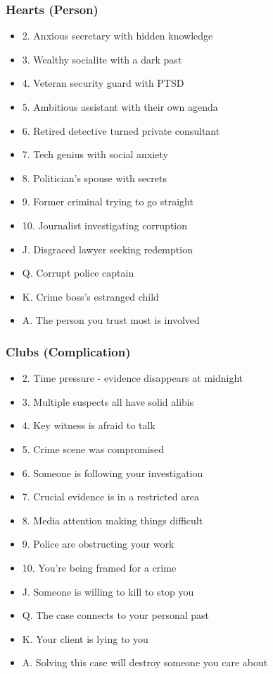 \documentclass[11pt]{article}
\begin{document}
\subsubsection{Hearts (Person)}
\begin{itemize}
    \item 2. Anxious secretary with hidden knowledge
    \item 3. Wealthy socialite with a dark past
    \item 4. Veteran security guard with PTSD
    \item 5. Ambitious assistant with their own agenda
    \item 6. Retired detective turned private consultant
    \item 7. Tech genius with social anxiety
    \item 8. Politician's spouse with secrets
    \item 9. Former criminal trying to go straight
    \item 10. Journalist investigating corruption
    \item J. Disgraced lawyer seeking redemption
    \item Q. Corrupt police captain
    \item K. Crime boss's estranged child
    \item A. The person you trust most is involved
\end{itemize}

\subsubsection{Clubs (Complication)}
\begin{itemize}
    \item 2. Time pressure - evidence disappears at midnight
    \item 3. Multiple suspects all have solid alibis
    \item 4. Key witness is afraid to talk
    \item 5. Crime scene was compromised
    \item 6. Someone is following your investigation
    \item 7. Crucial evidence is in a restricted area
    \item 8. Media attention making things difficult
    \item 9. Police are obstructing your work
    \item 10. You're being framed for a crime
    \item J. Someone is willing to kill to stop you
    \item Q. The case connects to your personal past
    \item K. Your client is lying to you
    \item A. Solving this case will destroy someone you care about
\end{itemize}
\end{document}
